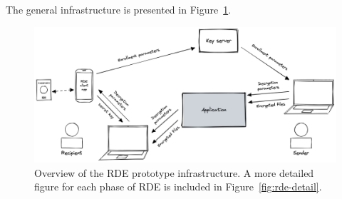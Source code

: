 The general infrastructure is presented in Figure~\ref{fig:rde-prototype-infrastructure-overview}.
\begin{figure}
    \centering
    \includegraphics[width=\textwidth]{imgs/RDE infra overview}
    \caption{Overview of the RDE prototype infrastructure.
    A more detailed figure for each phase of RDE is included in Figure~\ref{fig:rde-detail}.}
    \label{fig:rde-prototype-infrastructure-overview}
\end{figure}

